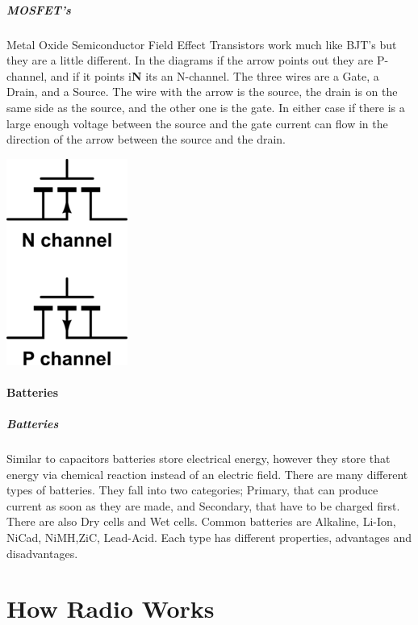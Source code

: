 \documentclass[10pt, handout]{beamer}
\begin{document}
\begin{frame}
\frametitle{MOSFET's}
Metal Oxide Semiconductor Field Effect Transistors work much like BJT's but they are a little different. In the diagrams if the arrow points out they are P-channel, and if it points i\textbf{N} its an N-channel. The three wires are a Gate, a Drain, and a Source. The wire with the arrow is the source, the drain is on the same side as the source, and the other one is the gate. In either case if there is a large enough voltage between the source and the gate current can flow in the direction of the arrow between the source and the drain.
\begin{center}
\includegraphics{mosfets.png}
\end{center}
\end{frame}

\subsection{Batteries}

\begin{frame}
\frametitle{Batteries}
Similar to capacitors batteries store electrical energy, however they store that energy via chemical reaction instead of an electric field. There are many different types of batteries. They fall into two categories; Primary, that can produce current as soon as they are made, and Secondary, that have to be charged first. There are also Dry cells and Wet cells. Common batteries are Alkaline, Li-Ion, NiCad, NiMH,ZiC, Lead-Acid. Each type has different properties, advantages and disadvantages.
\end{frame}


\part{How Radio Works}
\end{document}
